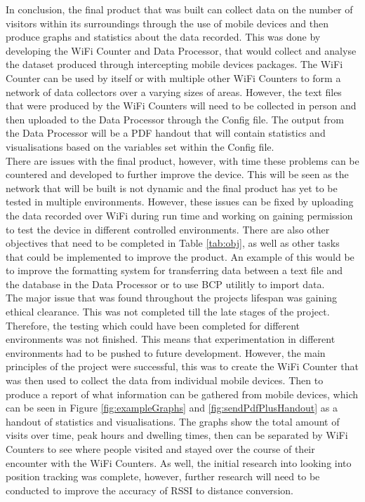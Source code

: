 \documentclass{report}
\begin{document}
In conclusion, the final product that was built can collect data on the number of visitors within its surroundings through the use of mobile devices and then produce graphs and statistics about the data recorded. This was done by developing the WiFi Counter and Data Processor, that would collect and analyse the dataset produced through intercepting mobile devices packages. The WiFi Counter can be used by itself or with multiple other WiFi Counters to form a network of data collectors over a varying sizes of areas. However, the text files that were produced by the WiFi Counters will need to be collected in person and then uploaded to the Data Processor through the Config file. The output from the Data Processor will be a PDF handout that will contain statistics and visualisations based on the variables set within the Config file. \\ \newline
There are issues with the final product, however, with time these problems can be countered and developed to further improve the device. This will be seen as the network that will be built is not dynamic and the final product has yet to be tested in multiple environments.  However, these issues can be fixed by uploading the data recorded over WiFi during run time and working on gaining permission to test the device in different controlled environments. There are also other objectives that need to be completed in Table \ref{tab:obj}, as well as other tasks that could be implemented to improve the product. An example of this would be to improve the formatting system for transferring data between a text file and the database in the Data Processor or to use BCP utilitly\cite{BCP} to import data. \\ \newline
The major issue that was found throughout the projects lifespan was gaining ethical clearance. This was not completed till the late stages of the project. Therefore, the testing which could have been completed for different environments was not finished. This means that experimentation in different environments had to be pushed to future development. However, the main principles of the project were successful, this was to create the WiFi Counter that was then used to collect the data from individual mobile devices. Then to produce a report of what information can be gathered from mobile devices, which can be seen in Figure \ref{fig:exampleGraphs} and \ref{fig:sendPdfPlusHandout} as a handout of statistics and visualisations. The graphs show the total amount of visits over time, peak hours and dwelling times, then can be separated by WiFi Counters to see where people visited and stayed over the course of their encounter with the WiFi Counters. As well, the initial research into looking into position tracking was complete, however, further research will need to be conducted to improve the accuracy of RSSI to distance conversion. \\ \newline
\end{document}
